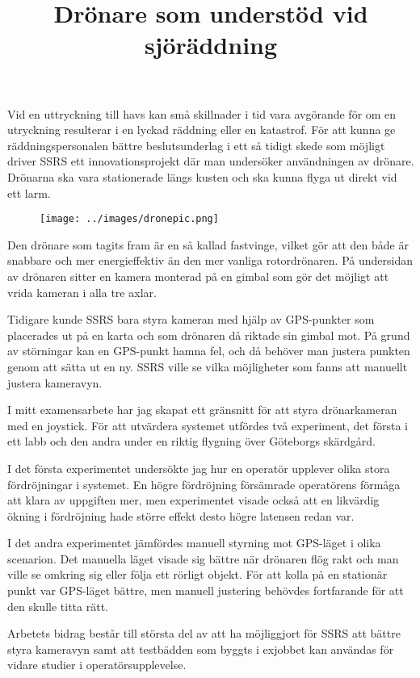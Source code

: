 \documentclass{popsci}
\title{Drönare som understöd vid sjöräddning}
\begin{document}

{\noindent Vid en uttryckning till havs kan små skillnader i tid vara avgörande för om en utryckning resulterar i en lyckad räddning eller en katastrof. För att kunna ge räddningspersonalen bättre beslutsunderlag i ett så tidigt skede som möjligt driver SSRS ett innovationsprojekt där man undersöker användningen av drönare. Drönarna ska vara stationerade längs kusten och ska kunna flyga ut direkt vid ett larm.

\begin{figure}[!bth] %
    \texttt{[image: ../images/dronepic.png]} 
\end{figure}

Den drönare som tagits fram är en så kallad fastvinge, vilket gör att den både är snabbare och mer energieffektiv än den mer vanliga rotordrönaren. På undersidan av drönaren sitter en kamera monterad på en gimbal som gör det möjligt att vrida kameran i alla tre axlar.

Tidigare kunde SSRS bara styra kameran med hjälp av GPS-punkter som placerades ut på en karta och som drönaren då riktade sin gimbal mot. På grund av störningar kan en GPS-punkt hamna fel, och då behöver man justera punkten genom att sätta ut en ny. SSRS ville se vilka möjligheter som fanns att manuellt justera kameravyn.

I mitt examensarbete har jag skapat ett gränsnitt för att styra drönarkameran med en joystick. För att utvärdera systemet utfördes två experiment, det första i ett labb och den andra under en riktig flygning över Göteborgs skärdgård.

I det första experimentet undersökte jag hur en operatör upplever olika stora fördröjningar i systemet. En högre fördröjning försämrade operatörens förmåga att klara av uppgiften mer, men experimentet visade också att en likvärdig ökning i fördröjning hade större effekt desto högre latensen redan var.

I det andra experimentet jämfördes manuell styrning mot GPS-läget i olika scenarion. Det manuella läget visade sig bättre när drönaren flög rakt och man ville se omkring sig eller följa ett rörligt objekt. För att kolla på en stationär punkt var GPS-läget bättre, men manuell justering behövdes fortfarande för att den skulle titta rätt. 

Arbetets bidrag består till största del av att ha möjliggjort för SSRS att bättre styra kameravyn samt att testbädden som byggts i exjobbet kan användas för vidare studier i operatörsupplevelse.    
}
\end{document}
